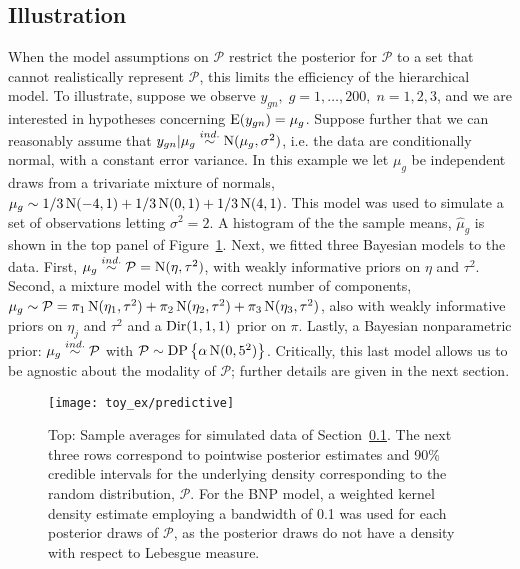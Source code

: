 \subsection{Illustration}
\label{subsec:illustration}
When the model assumptions on $\mathcal{P}$ restrict the posterior for $\mathcal{P}$ to a set that cannot realistically represent $\mathcal{P}$, this limits the efficiency of the hierarchical model. To illustrate, suppose we observe $y_{gn},\; g=1,\ldots,200,\;n=1,2,3$, and we are interested in hypotheses concerning $\operatorname{E}(y_{gn})=\mu_g$. Suppose further that we can reasonably assume that $y_{gn}|\mu_g \stackrel{ind.}{\sim} \operatorname{N}(\mu_g,\sigma^2)$, i.e. the data are conditionally normal, with a constant error variance. In this example we let $\mu_g$ be independent draws from a trivariate mixture of normals, $\mu_g \sim 1/3\operatorname{N}(-4,1)+1/3\operatorname{N}(0,1)+1/3\operatorname{N}(4,1)$. This model was used to simulate a set of observations letting $\sigma^2=2$. A histogram of the the sample means, $\hat{\mu}_g$ is shown in the top panel of Figure~\ref{predictive}. Next, we fitted three Bayesian models to the data. First, $\mu_g \stackrel{ind.}{\sim} \mathcal{P}=\operatorname{N}(\eta, \tau^2)$, with weakly informative priors on $\eta$ and $\tau^2$. Second, a mixture model with the correct number of components, $\mu_g \sim \mathcal{P}=\pi_1\operatorname{N}(\eta_1,\tau^2)+\pi_2\operatorname{N}(\eta_2,\tau^2)+\pi_3\operatorname{N}(\eta_3,\tau^2)$, also with weakly informative priors on $\eta_j$ and $\tau^2$ and a $\operatorname{Dir}(1,1,1)$ prior on $\pi$. Lastly, a Bayesian nonparametric prior: $\mu_g \stackrel{ind.}{\sim} \mathcal{P}$ with $\mathcal{P} \sim \operatorname{DP}\left\{\alpha \operatorname{N}(0,5^2)\right\}$. Critically, this last model allows us to be agnostic about the modality of $\mathcal{P}$; further details are given in the next section.

\begin{figure}[h!]
\centering
\texttt{[image: toy\_ex/predictive]}
\begin{minipage}{.8\textwidth}
\caption{\small Top: Sample averages for simulated data of Section~\ref{subsec:illustration}. The next three rows correspond to pointwise posterior estimates and 90\% credible intervals for the underlying density corresponding to the random distribution, $\mathcal{P}$. For the BNP model, a weighted kernel density estimate employing a bandwidth of 0.1  was used for each posterior draws of $\mathcal{P}$, as the posterior draws do not have a density with respect to Lebesgue measure.}
\end{minipage}
\label{predictive}
\end{figure}


